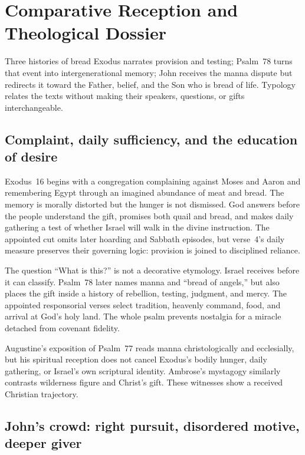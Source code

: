 \section*{Comparative Reception and Theological Dossier}

\begin{studybox}{Three histories of bread}
Exodus narrates provision and testing; Psalm~78 turns that event into
intergenerational memory; John receives the manna dispute but redirects it
toward the Father, belief, and the Son who is bread of life. Typology relates
the texts without making their speakers, questions, or gifts interchangeable.
\end{studybox}

\subsection*{Complaint, daily sufficiency, and the education of desire}

Exodus~16 begins with a congregation complaining against Moses and Aaron and
remembering Egypt through an imagined abundance of meat and bread. The memory
is morally distorted but the hunger is not dismissed. God answers before the
people understand the gift, promises both quail and bread, and makes daily
gathering a test of whether Israel will walk in the divine instruction. The
appointed cut omits later hoarding and Sabbath episodes, but verse~4's daily
measure preserves their governing logic: provision is joined to disciplined
reliance.

The question ``What is this?'' is not a decorative etymology. Israel receives
before it can classify. Psalm~78 later names manna and ``bread of angels,'' but
also places the gift inside a history of rebellion, testing, judgment, and
mercy. The appointed responsorial verses select tradition, heavenly command,
food, and arrival at God's holy land. The whole psalm prevents nostalgia for a
miracle detached from covenant fidelity.

Augustine's exposition of Psalm~77 reads manna christologically and
ecclesially, but his spiritual reception does not cancel Exodus's bodily
hunger, daily gathering, or Israel's own scriptural identity. Ambrose's
mystagogy similarly contrasts wilderness figure and Christ's gift. These
witnesses show a received Christian trajectory.

\subsection*{John's crowd: right pursuit, disordered motive, deeper giver}

